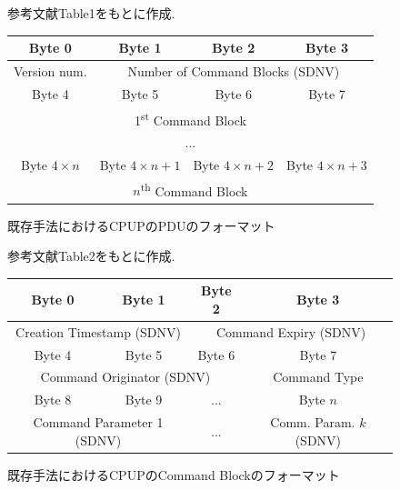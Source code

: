 \begin{figure}[htbp]
    \centering
    \caption{既存手法におけるCPUPのPDUのフォーマット}
    \label{figure:cpup_pdu_format}
    \begin{minipage}{\textwidth}
        \centering
        \vspace{1mm} 
        \fontsize{10.5pt}{12pt}\selectfont
        参考文献\cite{Bezirgiannidis2013}Table1をもとに作成. 
        \vspace{1mm} 
    \end{minipage}
    \begin{tabular}{|c|c|c|c|}
      \hline
      Byte 0 & Byte 1 & Byte 2 & Byte 3 \\
      \hline
      \multicolumn{1}{|c|}{Version num.} & \multicolumn{3}{c|}{Number of Command Blocks (SDNV)} \\
      \hline
      Byte 4 & Byte 5 & Byte 6 & Byte 7 \\
      \hline
      \multicolumn{4}{|c|}{1\textsuperscript{st} Command Block} \\
      \hline
      \multicolumn{4}{|c|}{...} \\
      \hline
      Byte $4\times n$ & Byte $4\times n+1$ & Byte $4\times n+2$ & Byte $4\times n+3$ \\
      \hline
      \multicolumn{4}{|c|}{$n$\textsuperscript{th} Command Block} \\
      \hline
    \end{tabular}
  \end{figure}
\begin{figure}[htbp]
    \centering
    \caption{既存手法におけるCPUPのCommand Blockのフォーマット}
    \label{figure:command_block_format}
    \begin{minipage}{\textwidth}
        \centering
        \vspace{1mm} 
        \fontsize{10.5pt}{12pt}\selectfont
        参考文献\cite{Bezirgiannidis2013}Table2をもとに作成. 
        \vspace{1mm} 
    \end{minipage}
    \begin{tabular}{|c|c|c|c|}
      \hline
      Byte 0 & Byte 1 & Byte 2 & Byte 3 \\
      \hline
      \multicolumn{2}{|c|}{Creation Timestamp (SDNV)} & \multicolumn{2}{c|}{Command Expiry (SDNV)} \\
      \hline
      Byte 4 & Byte 5 & Byte 6 & Byte 7 \\
      \hline
      \multicolumn{3}{|c|}{Command Originator (SDNV)} & Command Type \\
      \hline
      Byte 8 & Byte 9 & ... & Byte $n$ \\
      \hline
      \multicolumn{2}{|c|}{Command Parameter 1 (SDNV)} & \multicolumn{1}{c|}{...} & Comm. Param. $k$ (SDNV) \\
      \hline
    \end{tabular}
\end{figure}

